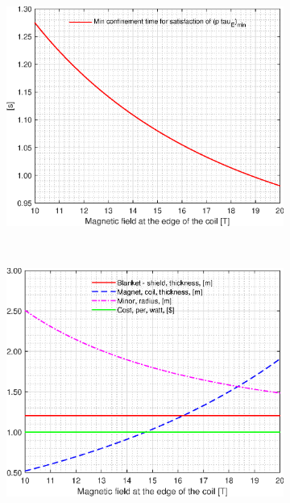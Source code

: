 \begin{figure}[H]
	\centering
	\begin{subfigure}[h!]{.45\textwidth}
		\includegraphics[width=\textwidth]{MatlabFigures/Bmax/f1.eps}
	\end{subfigure}
	~
	\begin{subfigure}[h!]{.45\textwidth}
		\includegraphics[width=\textwidth]{MatlabFigures/Bmax/f2.eps}
	\end{subfigure}


\end{figure}
